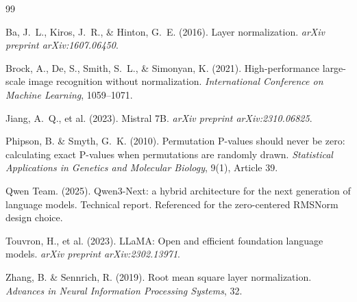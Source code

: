 \documentclass{article}
\begin{document}
\begin{thebibliography}{99}

Ba, J.~L., Kiros, J.~R., \& Hinton, G.~E. (2016).
\newblock Layer normalization.
\newblock \emph{arXiv preprint arXiv:1607.06450}.

Brock, A., De, S., Smith, S.~L., \& Simonyan, K. (2021).
\newblock High-performance large-scale image recognition without normalization.
\newblock \emph{International Conference on Machine Learning}, 1059--1071.

Jiang, A.~Q., et al. (2023).
\newblock Mistral 7B.
\newblock \emph{arXiv preprint arXiv:2310.06825}.

Phipson, B. \& Smyth, G.~K. (2010).
\newblock Permutation P-values should never be zero: calculating exact
P-values when permutations are randomly drawn.
\newblock \emph{Statistical Applications in Genetics and Molecular Biology}, 9(1), Article 39.

Qwen Team. (2025).
\newblock Qwen3-Next: a hybrid architecture for the next generation of
language models.
\newblock Technical report.
\newblock Referenced for the zero-centered RMSNorm design choice.

Touvron, H., et al. (2023).
\newblock LLaMA: Open and efficient foundation language models.
\newblock \emph{arXiv preprint arXiv:2302.13971}.

Zhang, B. \& Sennrich, R. (2019).
\newblock Root mean square layer normalization.
\newblock \emph{Advances in Neural Information Processing Systems}, 32.

\end{thebibliography}
\end{document}
